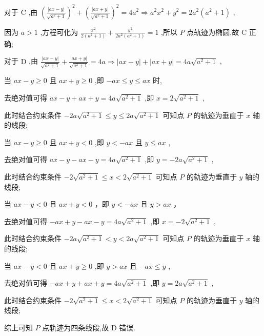 \documentclass[10pt]{article}
\newcommand*\circled[1]{\tikz[baseline=(char.base)]{\node[shape=circle,draw,inner sep=1.5pt] (char) {\small #1};}}
\begin{document}
对于 \(\mathrm{C}\) ,由 \({\left( \frac{\left| ax - y\right| }{\sqrt{{a}^{2} + 1}}\right) }^{2} + {\left( \frac{\left| ax + y\right| }{\sqrt{{a}^{2} + 1}}\right) }^{2} = 4{a}^{2} \Rightarrow  {a}^{2}{x}^{2} + {y}^{2} = 2{a}^{2}\left( {{a}^{2} + 1}\right)\) ,

因为 \(a > 1\) ,方程可化为 \(\frac{{x}^{2}}{2\left( {{a}^{2} + 1}\right) } + \frac{{y}^{2}}{2{a}^{2}\left( {{a}^{2} + 1}\right) } = 1\) ,所以 \(P\) 点轨迹为椭圆,故 \(\mathrm{C}\) 正确;

对于 \(\mathrm{D}\) ,由 \(\frac{\left| ax - y\right| }{\sqrt{{a}^{2} + 1}} + \frac{\left| ax + y\right| }{\sqrt{{a}^{2} + 1}} = {4a} \Rightarrow  \left| {{ax} - y}\right|  + \left| {{ax} + y}\right|  = {4a}\sqrt{{a}^{2} + 1}\) ,

 \circled{1}  当 \({ax} - y \geq  0\) 且 \({ax} + y \geq  0\) ,即 \(- {ax} \leq  y \leq  {ax}\) 时,

去绝对值可得 \({ax} - y + {ax} + y = {4a}\sqrt{{a}^{2} + 1}\) ,即 \(x = 2\sqrt{{a}^{2} + 1}\) ,

此时结合约束条件 \(- {2a}\sqrt{{a}^{2} + 1} \leq  y \leq  {2a}\sqrt{{a}^{2} + 1}\) 可知点 \(P\) 的轨迹为垂直于 \(x\) 轴的线段;

 \circled{2}  当 \({ax} - y \geq  0\) 且 \({ax} + y < 0\) ,即 \(y <  - {ax}\) 且 \(y \leq  {ax}\) ,

去绝对值可得 \({ax} - y - {ax} - y = {4a}\sqrt{{a}^{2} + 1}\) ,即 \(y =  - {2a}\sqrt{{a}^{2} + 1}\) ,

此时结合约束条件 \(- 2\sqrt{{a}^{2} + 1} \leq  x < 2\sqrt{{a}^{2} + 1}\) 可知点 \(P\) 的轨迹为垂直于 \(y\) 轴的线段;

 \circled{3}  当 \({ax} - y < 0\) 且 \({ax} + y < 0\) ，即 \(y <  - {ax}\) 且 \(y > {ax}\) ，

去绝对值可得 \(- {ax} + y - {ax} - y = {4a}\sqrt{{a}^{2} + 1}\) ,即 \(x =  - 2\sqrt{{a}^{2} + 1}\) ,

此时结合约束条件 \(- {2a}\sqrt{{a}^{2} + 1} < y < {2a}\sqrt{{a}^{2} + 1}\) 可知点 \(P\) 的轨迹为垂直于 \(x\) 轴的线段;

 \circled{4}  当 \({ax} - y < 0\) 且 \({ax} + y \geq  0\) ,即 \(y > {ax}\) 且 \(- {ax} \leq  y\) ,

去绝对值可得 \(- {ax} + y + {ax} + y = {4a}\sqrt{{a}^{2} + 1}\) ,即 \(y = {2a}\sqrt{{a}^{2} + 1}\) ,

此时结合约束条件 \(- 2\sqrt{{a}^{2} + 1} \leq  x < 2\sqrt{{a}^{2} + 1}\) 可知点 \(P\) 的轨迹为垂直于 \(y\) 轴的线段;

综上可知 \(P\) 点轨迹为四条线段,故 \(\mathrm{D}\) 错误.
\end{document}
